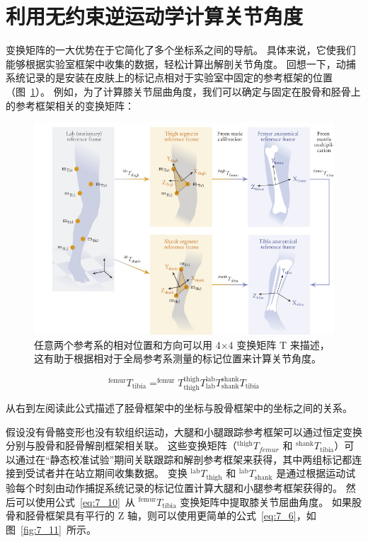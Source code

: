 \section{利用无约束逆运动学计算关节角度}

变换矩阵的一大优势在于它简化了多个坐标系之间的导航。
具体来说，它使我们能够根据实验室框架中收集的数据，轻松计算出解剖关节角度。
回想一下，动捕系统记录的是安装在皮肤上的标记点相对于实验室中固定的参考框架的位置（图~\ref{fig:7_13}）。
例如，为了计算膝关节屈曲角度，我们可以确定与固定在股骨和胫骨上的参考框架相关的变换矩阵：

\begin{figure}[!htb]
	\centering
	\includegraphics[width=1.0\linewidth]{chap7/7_13}
	\caption{任意两个参考系的相对位置和方向可以用 4$\times$4 变换矩阵 T 来描述，这有助于根据相对于全局参考系测量的标记位置来计算关节角度。 \label{fig:7_13}}
\end{figure}

\begin{equation}
	^\text{femur} T_\text{tibia} = 
		^\text{femur} T_\text{thigh}
		^\text{thigh} T_\text{lab}
		^\text{lab} T_\text{shank}
		^\text{shank} T_\text{tibia}
	\label{eq:7_15}
\end{equation}


从右到左阅读此公式描述了胫骨框架中的坐标与股骨框架中的坐标之间的关系。


假设没有骨骼变形也没有软组织运动，大腿和小腿跟踪参考框架可以通过恒定变换分别与股骨和胫骨解剖框架相关联。
这些变换矩阵（$^\text{thigh}T_{femur}$ 和 $^\text{shank}T_\text{tibia}$）可以通过在“静态校准试验”期间关联跟踪和解剖参考框架来获得，其中两组标记都连接到受试者并在站立期间收集数据。
变换 $^\text{lab}T_\text{thigh}$ 和 $^\text{lab}T_\text{shank}$ 是通过根据运动试验每个时刻由动作捕捉系统记录的标记位置计算大腿和小腿参考框架获得的。
然后可以使用公式~\ref{eq:7_10}~从 $^\text{femur}T_\text{tibia}$ 变换矩阵中提取膝关节屈曲角度。
如果股骨和胫骨框架具有平行的 Z 轴，则可以使用更简单的公式~\ref{eq:7_6}，如图~\ref{fig:7_11}~所示。


